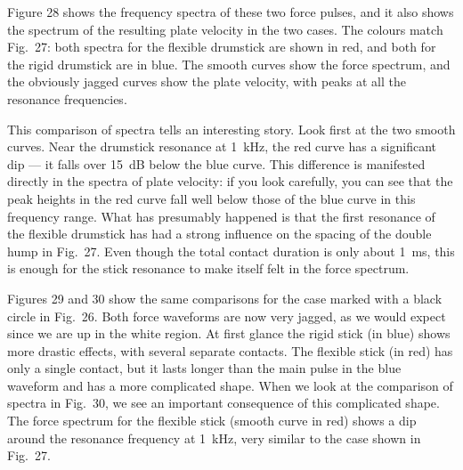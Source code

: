 
  Figure 28 shows the frequency spectra of these two force pulses, and it also 
  shows the spectrum of the resulting plate velocity in the two cases. The 
  colours match Fig.\ 27: both spectra for the flexible drumstick are shown in 
  red, and both for the rigid drumstick are in blue. The smooth curves show the 
  force spectrum, and the obviously jagged curves show the plate velocity, with 
  peaks at all the resonance frequencies. 


  This comparison of spectra tells an interesting story. Look first at the two 
  smooth curves. Near the drumstick resonance at 1~kHz, the red curve has a 
  significant dip — it falls over 15~dB below the blue curve. This difference 
  is manifested directly in the spectra of plate velocity: if you look 
  carefully, you can see that the peak heights in the red curve fall well below 
  those of the blue curve in this frequency range. What has presumably happened 
  is that the first resonance of the flexible drumstick has had a strong 
  influence on the spacing of the double hump in Fig.\ 27. Even though the 
  total contact duration is only about 1~ms, this is enough for the stick 
  resonance to make itself felt in the force spectrum. 

  Figures 29 and 30 show the same comparisons for the case marked with a black 
  circle in Fig.\ 26. Both force waveforms are now very jagged, as we would 
  expect since we are up in the white region. At first glance the rigid stick 
  (in blue) shows more drastic effects, with several separate contacts. The 
  flexible stick (in red) has only a single contact, but it lasts longer than 
  the main pulse in the blue waveform and has a more complicated shape. When we 
  look at the comparison of spectra in Fig.\ 30, we see an important 
  consequence of this complicated shape. The force spectrum for the flexible 
  stick (smooth curve in red) shows a dip around the resonance frequency at 
  1~kHz, very similar to the case shown in Fig.\ 27. 

